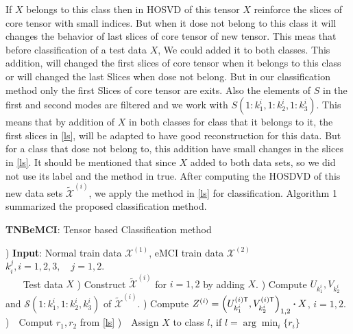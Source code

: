 \documentclass[journal]{IEEEtran}
\begin{document}
	If $X$ belongs to this class then in HOSVD of this tensor $X$ reinforce the slices of core tensor with small indices. But when it  dose not belong to this class  it  will changes the behavior of last slices of core tensor of new tensor. This meas that before classification of a test data $X$, We could added it to both classes. This addition,  will changed the first slices of core tensor when it belongs to this  class or
	will changed the last Slices  when dose not belong. But in our classification method only the first Slices of core tensor are exits. Also the elements of $S$ in the first and second modes are filtered and we work with $S(1:k_1^i,1:k_2^i,1:k_3^i)$.  This means that by addition of $X$ in both classes for class that it belongs to it, the first slices in \eqref{ls}, will be  adapted to have good reconstruction for this data. But for a class that dose not belong to, this addition have small changes in the slices in \eqref{ls}.
	It should be mentioned that
	since $X$ added to both data sets, so we did not use its label and the method in true. After computing the HOSDVD of this new data sets $\widetilde{\mathcal{X}}^{(i)}$, we apply the method in \eqref{ls} for classification.  Algorithm 1 summarized the proposed classification method.
	\begin{algorithm}[h!]
		\label{ATNB}
		\caption{\textbf{TNBeMCI}: Tensor based Classification method}
		\begin{algorithmic}
			) \textbf{Input}: Normal train data $\mathcal{X}^{(1)}$, eMCI train data $\mathcal{X}^{(2)}$
			\STATE~~~    $k_i^j, i=1,2,3, \quad j=1,2$.\\
			\STATE~~~ Test data $X$
			) Construct $\widetilde{\mathcal{X}}^{(i)}$ for $i=1,2$ by adding $X$.
			) Compute $U_{k_1^i}, V_{k_2^i}$ and $\mathcal{S}(1:k_1^i,1:k_2^i,k_3^i)$ of  $\widetilde{\mathcal{X}}^{(i)}$.
			) Compute $Z^{(i)} = \left( U_{k_1^i}^{(i)\sf T}, V_{k_2^i}^{(i)\sf T} 
			\right)_{1,2}\boldsymbol{\cdot} X$, $i=1,2.$
			)~~Comput $r_1,r_2$ from \eqref{ls}
			 )~~Assign $X$ to class $l$, if $l= \arg \min_{i} \{r_i\}$
		\end{algorithmic}
	\end{algorithm}
	
\end{document}
